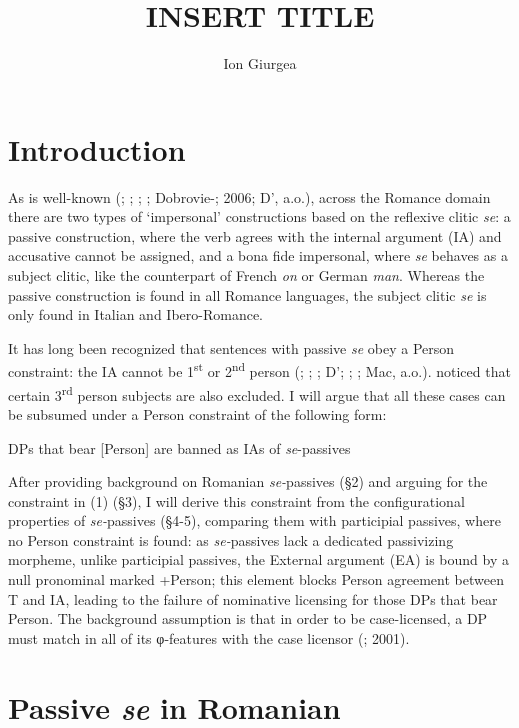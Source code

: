 \documentclass[output=paper]{langsci/langscibook}
\author{Ion Giurgea\affiliation{The “Iorgu Iordan - Alexandru Rosetti” Institute of Linguistics of the Romanian Academy, Bucharest}}
\title{INSERT TITLE}
\begin{document}
\section{Introduction}%

As is well-known (\citealt{Belletti1982}; \citealt{Burzio1986}; \citealt{Manzini1986}; \citealt{Cinque1988}; Dobrovie-\citealt{Sorin1998}; 2006; D’\citealt{Alessandro2007}, a.o.), across the Romance domain there are two types of ‘impersonal’ constructions based on the reflexive clitic \textit{se}: a passive construction, where the verb agrees with the internal argument (IA) and accusative cannot be assigned, and a bona fide impersonal, where \textit{se} behaves as a subject clitic, like the counterpart of French \textit{on} or German \textit{man}. Whereas the passive construction is found in all Romance languages, the subject clitic \textit{se} is only found in Italian and Ibero-Romance.

It has long been recognized that sentences with passive \textit{se} obey a Person constraint: the IA cannot be 1\textsuperscript{st} or 2\textsuperscript{nd} person (\citealt{Burzio1986}; \citealt{Cinque1988}; \citealt{Cornilescu1998}; D’\citealt{Alessandro2007}; \citealt{Mendikoetxea2008}; \citealt{Rezac2011}; Mac\citealt{Donald2017}, a.o.). \citet{Cornilescu1998} noticed that certain 3\textsuperscript{rd} person subjects are also excluded. I will argue that all these cases can be subsumed under a Person constraint of the following form:

\ea%
    \label{ex:giurgea:1}
DPs that bear [Person] are banned as IAs of \textit{se}{}-passives
\z

After providing background on Romanian \textit{se-}passives (§2) and arguing for the constraint in (1) (§3), I will derive this constraint from the configurational properties of \textit{se-}passives (§4-5), comparing them with participial passives, where no Person constraint is found: as \textit{se-}passives lack a dedicated passivizing morpheme, unlike participial passives, the External argument (EA) is bound by a null pronominal marked +Person; this element blocks Person agreement between T and IA, leading to the failure of nominative licensing for those DPs that bear Person. The background assumption is that in order to be case-licensed, a DP must match in all of its φ-features with the case licensor (\citealt{Chomsky2000}; 2001).

\section{Passive \textit{se} in Romanian}%
\end{document}
